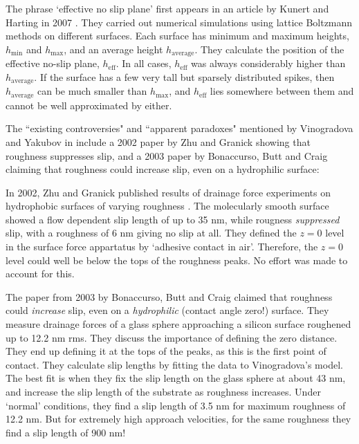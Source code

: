 \documentclass[12pt, a4paper, twoside, openright]{book}
\begin{document}
The phrase `effective no slip plane'  first appears in an article by
Kunert and Harting in 2007 \cite{KunertHarting2007}.
They carried out numerical simulations using lattice Boltzmann methods on different surfaces.  Each surface has minimum and maximum heights, $h_{\mathrm{min}}$ and $h_{\mathrm{max}}$, and an average height $h_{\mathrm{average}}$.  They calculate the position of the effective no-slip plane, $h_{\mathrm{eff}}$.  In all cases, $h_{\mathrm{eff}}$ was always considerably higher than $h_{\mathrm{average}}$.  If the surface has a few very tall but sparsely distributed spikes, then $h_{\mathrm{average}}$ can be much smaller than $h_{\mathrm{max}}$, and $h_{\mathrm{eff}}$ lies somewhere between them and cannot be well approximated by either.

\vspace*{1em}

The ``existing controversies" and ``apparent paradoxes" mentioned by Vinogradova and Yakubov in \cite{VinogradovaYakubov2006} include a 2002 paper by Zhu and Granick \cite{ZhuGranick2002} showing that roughness suppresses slip, and a 2003 paper by Bonaccurso, Butt and Craig \cite{BonaccursoButtCraig2003} claiming that roughness could increase slip, even on a hydrophilic surface:


In 2002, Zhu and Granick published results of drainage force experiments on hydrophobic surfaces of varying roughness \cite{ZhuGranick2002}.  The molecularly smooth surface showed a flow dependent slip length of up to 35 nm, while rougness \emph{suppressed} slip, with a roughness of 6 nm giving no slip at all.
They defined the $z=0$ level in the surface force appartatus by `adhesive contact in air'.  Therefore, the $z=0$ level could well be below the tops of the roughness peaks.  No effort was made to account for this.


The paper from 2003 by Bonaccurso, Butt and Craig \cite{BonaccursoButtCraig2003} claimed that roughness could \emph{increase} slip, even on a \emph{hydrophilic} (contact angle zero!) surface.
They measure drainage forces of a glass sphere approaching a silicon surface roughened up to 12.2 nm rms.
They discuss the importance of defining the zero distance.  They end up defining it at the tops of the peaks, as this is the first point of contact.  They calculate slip lengths by fitting the data to Vinogradova's model.  The best fit is when they fix the slip length on the glass sphere at about 43 nm, and increase the slip length of the substrate as roughness increases.  Under `normal' conditions, they find a slip length of 3.5 nm for maximum roughness of 12.2 nm.  But for extremely high approach velocities, for the same roughness they find a slip length of 900 nm!
\end{document}
